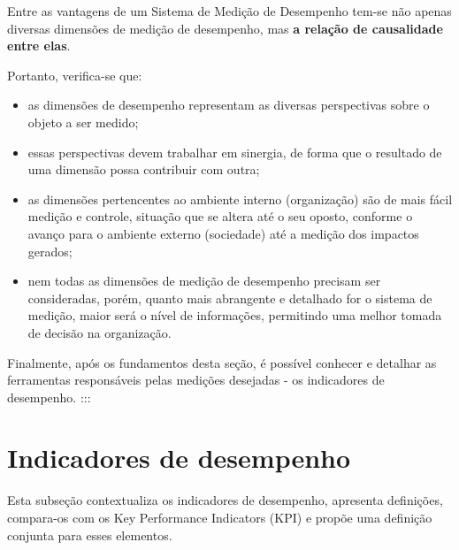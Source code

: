 \documentclass[
  letterpaper,
  DIV=11,
  numbers=noendperiod]{scrreprt}
\begin{document}
\begin{tcolorbox}[enhanced jigsaw, colframe=quarto-callout-note-color-frame, opacityback=0, toprule=.15mm, breakable, leftrule=.75mm, title=\textcolor{quarto-callout-note-color}{\faInfo}\hspace{0.5em}{Nota}, rightrule=.15mm, colbacktitle=quarto-callout-note-color!10!white, colback=white, arc=.35mm, bottomtitle=1mm, toptitle=1mm, bottomrule=.15mm, titlerule=0mm, opacitybacktitle=0.6, coltitle=black, left=2mm]

Entre as vantagens de um Sistema de Medição de Desempenho tem-se não
apenas diversas dimensões de medição de desempenho, mas \textbf{a
relação de causalidade entre elas}.

\end{tcolorbox}

Portanto, verifica-se que:

\begin{itemize}
\item
  as dimensões de desempenho representam as diversas perspectivas sobre
  o objeto a ser medido;
\item
  essas perspectivas devem trabalhar em sinergia, de forma que o
  resultado de uma dimensão possa contribuir com outra;
\item
  as dimensões pertencentes ao ambiente interno (organização) são de
  mais fácil medição e controle, situação que se altera até o seu
  oposto, conforme o avanço para o ambiente externo (sociedade) até a
  medição dos impactos gerados;
\item
  nem todas as dimensões de medição de desempenho precisam ser
  consideradas, porém, quanto mais abrangente e detalhado for o sistema
  de medição, maior será o nível de informações, permitindo uma melhor
  tomada de decisão na organização.
\end{itemize}

Finalmente, após os fundamentos desta seção, é possível conhecer e
detalhar as ferramentas responsáveis pelas medições desejadas - os
indicadores de desempenho. :::

\hypertarget{indicadores-de-desempenho}{%
\chapter{Indicadores de desempenho}\label{indicadores-de-desempenho}}

{Esta subseção contextualiza os indicadores de desempenho, apresenta
definições, compara-os com os Key Performance Indicators (KPI) e propõe
uma definição conjunta para esses elementos.}
\end{document}
